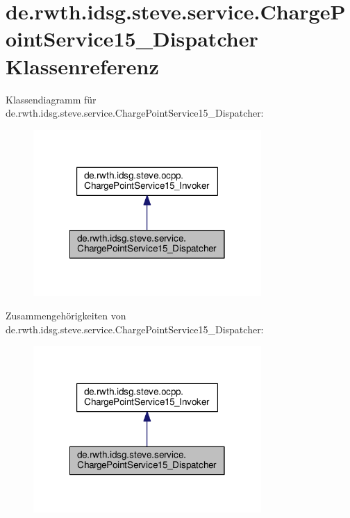 \hypertarget{classde_1_1rwth_1_1idsg_1_1steve_1_1service_1_1_charge_point_service15___dispatcher}{\section{de.\-rwth.\-idsg.\-steve.\-service.\-Charge\-Point\-Service15\-\_\-\-Dispatcher Klassenreferenz}
\label{classde_1_1rwth_1_1idsg_1_1steve_1_1service_1_1_charge_point_service15___dispatcher}
}


Klassendiagramm für de.\-rwth.\-idsg.\-steve.\-service.\-Charge\-Point\-Service15\-\_\-\-Dispatcher\-:\nopagebreak
\begin{figure}[H]
\begin{center}
\leavevmode
\includegraphics[width=246pt]{classde_1_1rwth_1_1idsg_1_1steve_1_1service_1_1_charge_point_service15___dispatcher__inherit__graph}
\end{center}
\end{figure}


Zusammengehörigkeiten von de.\-rwth.\-idsg.\-steve.\-service.\-Charge\-Point\-Service15\-\_\-\-Dispatcher\-:\nopagebreak
\begin{figure}[H]
\begin{center}
\leavevmode
\includegraphics[width=246pt]{classde_1_1rwth_1_1idsg_1_1steve_1_1service_1_1_charge_point_service15___dispatcher__coll__graph}
\end{center}
\end{figure}

